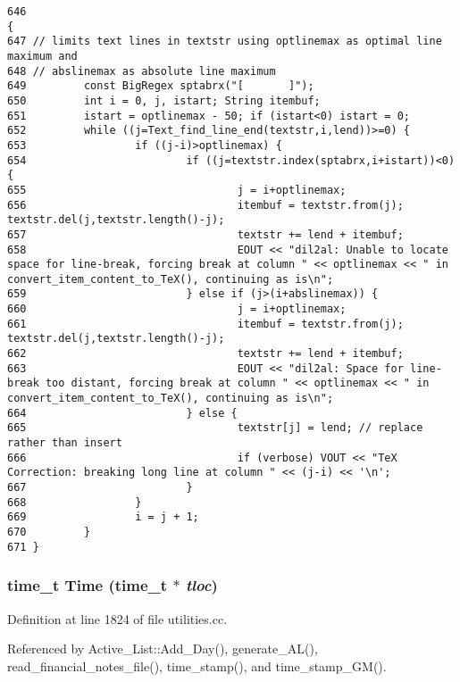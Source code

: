 \footnotesize\begin{verbatim}646                                                                                                 {
647 // limits text lines in textstr using optlinemax as optimal line maximum and
648 // abslinemax as absolute line maximum
649         const BigRegex sptabrx("[       ]");
650         int i = 0, j, istart; String itembuf;
651         istart = optlinemax - 50; if (istart<0) istart = 0;
652         while ((j=Text_find_line_end(textstr,i,lend))>=0) {
653                 if ((j-i)>optlinemax) {
654                         if ((j=textstr.index(sptabrx,i+istart))<0) {
655                                 j = i+optlinemax;
656                                 itembuf = textstr.from(j); textstr.del(j,textstr.length()-j);
657                                 textstr += lend + itembuf;
658                                 EOUT << "dil2al: Unable to locate space for line-break, forcing break at column " << optlinemax << " in convert_item_content_to_TeX(), continuing as is\n";
659                         } else if (j>(i+abslinemax)) {
660                                 j = i+optlinemax;
661                                 itembuf = textstr.from(j); textstr.del(j,textstr.length()-j);
662                                 textstr += lend + itembuf;
663                                 EOUT << "dil2al: Space for line-break too distant, forcing break at column " << optlinemax << " in convert_item_content_to_TeX(), continuing as is\n";
664                         } else {
665                                 textstr[j] = lend; // replace rather than insert
666                                 if (verbose) VOUT << "TeX Correction: breaking long line at column " << (j-i) << '\n';
667                         }
668                 }
669                 i = j + 1;
670         }
671 }
\end{verbatim}\normalsize 
{}
\subsubsection{\setlength{\rightskip}{0pt plus 5cm}time\_\-t Time (time\_\-t $\ast$ {\em tloc})}\label{dil2al_8hh_a217}




Definition at line 1824 of file utilities.cc.

Referenced by Active\_\-List::Add\_\-Day(), generate\_\-AL(), read\_\-financial\_\-notes\_\-file(), time\_\-stamp(), and time\_\-stamp\_\-GM().



